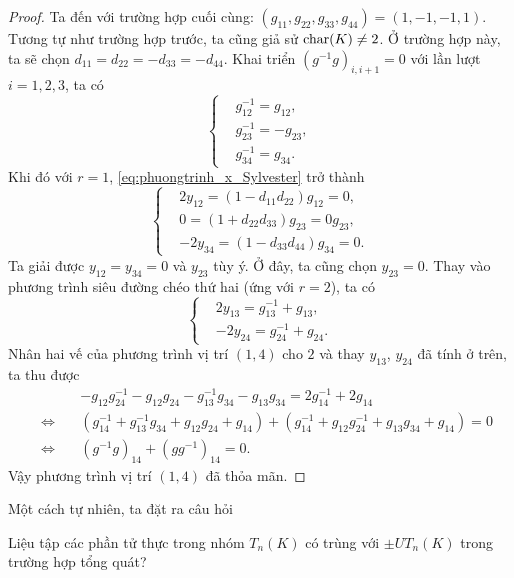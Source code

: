 \begin{proof}
Ta đến với trường hợp cuối cùng: $(g_{11},g_{22},g_{33},g_{44}) = (1,-1,-1,1)$. Tương tự như trường hợp trước, ta cũng giả sử $\operatorname{char}(K) \neq 2$. Ở trường hợp này, ta sẽ chọn $d_{11} = d_{22} = -d_{33} = -d_{44}$. Khai triển $(g^{-1}g)_{i,i+1} = 0$ với lần lượt $i = 1,2,3$, ta có
\[
    \left\{ \begin{aligned}
        & g^{-1}_{12} = g_{12}, \\
        & g^{-1}_{23} = -g_{23}, \\
        & g^{-1}_{34} = g_{34}.
    \end{aligned} \right.
\]
Khi đó với $r = 1$, \cref{eq:phuongtrinh_x_Sylvester} trở thành
    \[
    \left\{ \begin{aligned}
        & 2 y_{12} = (1 - d_{11} d_{22}) g_{12} = 0, \\
        & 0 = (1 + d_{22} d_{33}) g_{23} = 0 g_{23}, \\
        &-2 y_{34} = (1 - d_{33} d_{44}) g_{34} = 0.
    \end{aligned} \right.
    \]
    Ta giải được $y_{12} = y_{34} = 0$ và $y_{23}$ tùy ý. Ở đây, ta cũng chọn $y_{23} = 0$. Thay vào phương trình siêu đường chéo thứ hai (ứng với $r = 2$), ta có
    \[
        \left\{ \begin{aligned}
            & 2 y_{13} = g^{-1}_{13} + g_{13}, \\
            & -2 y_{24} = g^{-1}_{24} + g_{24}. 
        \end{aligned} \right.
    \]
    Nhân hai vế của phương trình vị trí $(1,4)$ cho $2$ và thay $y_{13}$, $y_{24}$ đã tính ở trên, ta thu được
    \begin{align*}
        & -g_{12} g^{-1}_{24} - g_{12} g_{24} - g_{13}^{-1} g_{34} - g_{13} g_{34} = 2 g_{14}^{-1} + 2 g_{14} \\
        \quad\Longleftrightarrow\quad
        & (g_{14}^{-1} + g_{13}^{-1} g_{34} + g_{12}g_{24} + g_{14}) + (g_{14}^{-1} + g_{12} g^{-1}_{24} + g_{13} g_{34} + g_{14}) = 0 \\
        \quad\Longleftrightarrow\quad
        & (g^{-1}g)_{14} + (gg^{-1})_{14} = 0.
    \end{align*}
    Vậy phương trình vị trí $(1,4)$ đã thỏa mãn.
\end{proof}
 
Một cách tự nhiên, ta đặt ra câu hỏi

\begin{prob*}
    Liệu tập các phần tử thực trong nhóm $T_n(K)$ có trùng với $\pm UT_n(K)$ trong trường hợp tổng quát?
\end{prob*}

